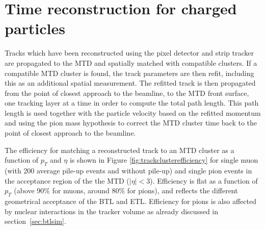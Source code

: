 \section{Time reconstruction for charged particles}

Tracks which have been reconstructed using the pixel detector and strip tracker are propagated to the MTD and spatially matched with compatible clusters.  If a compatible MTD cluster is found, the track parameters are then refit, including this as an additional spatial measurement.  The refitted track is then propagated from the point of closest approach to the beamline, to the MTD front surface, one tracking layer at a time in order to compute the total path length.  This path length is used together with the particle velocity based on the refitted momentum and using the pion mass hypothesis to correct the MTD cluster time back to the point of closest approach to the beamline.  

The efficiency for matching a reconstructed track to an MTD cluster as a function of $p_T$ and $\eta$ is shown in Figure \ref{fig:trackclusterefficiency} for single muon (with 200 average pile-up events and without pile-up) and single pion events in the acceptance region of the the MTD ($|\eta|<3$). Efficiency is flat as a function of $p_{T}$ (above 90\% for muons, around 80\% for pions), and reflects the different geometrical acceptance of the BTL and ETL. Efficiency for pions is also affected by nuclear interactions in the tracker volume as already discussed in section~\ref{sec:btlsim}.

